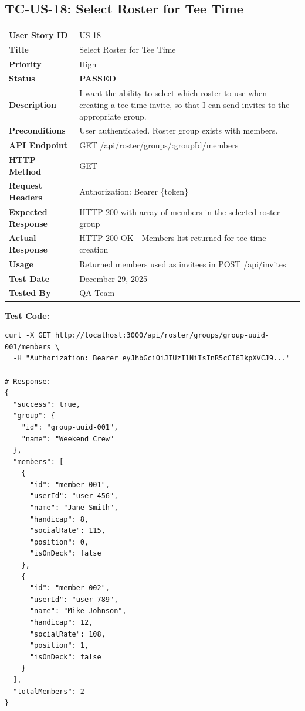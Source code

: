 \documentclass[11pt,a4paper]{article}
\newcommand{\passed}{\textcolor{pass}{\textbf{PASSED}}}
\begin{document}
\vspace{0.5cm}


\subsection{TC-US-18: Select Roster for Tee Time}

\begin{tabularx}{\textwidth}{|p{3.2cm}|Y|}
\hline
{}
 \\
\hline
\textbf{User Story ID} & US-18 \\
\hline
\textbf{Title} & Select Roster for Tee Time \\
\hline
\textbf{Priority} & High \\
\hline
\textbf{Status} & \passed \\
\hline
\textbf{Description} & I want the ability to select which roster to use when creating a tee time invite, so that I can send invites to the appropriate group. \\
\hline
\textbf{Preconditions} & User authenticated. Roster group exists with members. \\
\hline
\textbf{API Endpoint} & GET /api/roster/groups/:groupId/members \\
\hline
\textbf{HTTP Method} & GET \\
\hline
\textbf{Request Headers} & Authorization: Bearer \{token\} \\
\hline
\textbf{Expected Response} & HTTP 200 with array of members in the selected roster group \\
\hline
\textbf{Actual Response} & HTTP 200 OK - Members list returned for tee time creation \\
\hline
\textbf{Usage} & Returned members used as invitees in POST /api/invites \\
\hline
\textbf{Test Date} & December 29, 2025 \\
\hline
\textbf{Tested By} & QA Team \\
\hline
\end{tabularx}

\vspace{0.3cm}
\textbf{Test Code:}
\begin{lstlisting}
curl -X GET http://localhost:3000/api/roster/groups/group-uuid-001/members \
  -H "Authorization: Bearer eyJhbGciOiJIUzI1NiIsInR5cCI6IkpXVCJ9..."

# Response:
{
  "success": true,
  "group": {
    "id": "group-uuid-001",
    "name": "Weekend Crew"
  },
  "members": [
    {
      "id": "member-001",
      "userId": "user-456",
      "name": "Jane Smith",
      "handicap": 8,
      "socialRate": 115,
      "position": 0,
      "isOnDeck": false
    },
    {
      "id": "member-002",
      "userId": "user-789",
      "name": "Mike Johnson",
      "handicap": 12,
      "socialRate": 108,
      "position": 1,
      "isOnDeck": false
    }
  ],
  "totalMembers": 2
}
\end{lstlisting}
\end{document}

